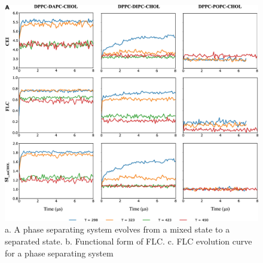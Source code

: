 \documentclass{biophys-new}
\begin{document}
\begin{figure}[hbt!]
\centering
\includegraphics[width=1\linewidth]{Figures/Main/3/placeholder.jpg}
\caption{a. A phase separating system evolves from a mixed state to a separated state. b. Functional form of FLC. c. FLC evolution curve for a phase separating system}
\label{fig3:view}
\end{figure}
\end{document}
